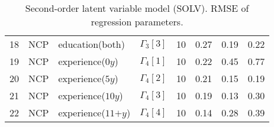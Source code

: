 \begin{table}[H]
\begin{tabular}{rlllrrrr}
		18 & NCP & \footnotesize{education(both)} & $\Gamma_{3}[3]$ & 10 & 0.27 & 0.19 & 0.22 \\ 
		19 & NCP & \footnotesize{experience($0y$)} & $\Gamma_{4}[1]$ & 10 & 0.22 & 0.45 & 0.77 \\ 
		20 & NCP & \footnotesize{experience($5y$)} & $\Gamma_{4}[2]$ & 10 & 0.21 & 0.15 & 0.19 \\ 
		21 & NCP & \footnotesize{experience($10y$)} & $\Gamma_{4}[3]$ & 10 & 0.19 & 0.13 & 0.30 \\
		22 & NCP & \footnotesize{experience($11\text{+}y$)} & $\Gamma_{4}[4]$ & 10 & 0.14 & 0.28 & 0.39 \\   
		\hline
	\end{tabular}
	\caption[Second-order latent variable model (SOLV). RMSE of regression parameters.]%
	{Second-order latent variable model (SOLV). RMSE of regression parameters.} 
	\label{tab:SOLV_RMSE_regression}
\end{table}

